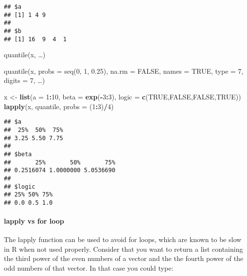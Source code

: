 \documentclass[
]{article}
\newenvironment{Shaded}{\begin{snugshade}}{\end{snugshade}}
\newcommand{\AttributeTok}[1]{\textcolor[rgb]{0.13,0.29,0.53}{#1}}
\newcommand{\ConstantTok}[1]{\textcolor[rgb]{0.56,0.35,0.01}{#1}}
\newcommand{\DecValTok}[1]{\textcolor[rgb]{0.00,0.00,0.81}{#1}}
\newcommand{\FunctionTok}[1]{\textcolor[rgb]{0.13,0.29,0.53}{\textbf{#1}}}
\newcommand{\NormalTok}[1]{#1}
\newcommand{\OtherTok}[1]{\textcolor[rgb]{0.56,0.35,0.01}{#1}}
\newcommand{\SpecialCharTok}[1]{\textcolor[rgb]{0.81,0.36,0.00}{\textbf{#1}}}
\begin{document}
\begin{verbatim}
## $a
## [1] 1 4 9
## 
## $b
## [1] 16  9  4  1
\end{verbatim}

quantile(x, \ldots)

quantile(x, probs = seq(0, 1, 0.25), na.rm = FALSE, names = TRUE, type =
7, digits = 7, \ldots)

\begin{Shaded}
\begin{Highlighting}[]
\NormalTok{x }\OtherTok{\textless{}{-}} \FunctionTok{list}\NormalTok{(}\AttributeTok{a =} \DecValTok{1}\SpecialCharTok{:}\DecValTok{10}\NormalTok{, }\AttributeTok{beta =} \FunctionTok{exp}\NormalTok{(}\SpecialCharTok{{-}}\DecValTok{3}\SpecialCharTok{:}\DecValTok{3}\NormalTok{), }\AttributeTok{logic =} \FunctionTok{c}\NormalTok{(}\ConstantTok{TRUE}\NormalTok{,}\ConstantTok{FALSE}\NormalTok{,}\ConstantTok{FALSE}\NormalTok{,}\ConstantTok{TRUE}\NormalTok{))}
\FunctionTok{lapply}\NormalTok{(x, quantile, }\AttributeTok{probs =}\NormalTok{ (}\DecValTok{1}\SpecialCharTok{:}\DecValTok{3}\NormalTok{)}\SpecialCharTok{/}\DecValTok{4}\NormalTok{)}
\end{Highlighting}
\end{Shaded}

\begin{verbatim}
## $a
##  25%  50%  75% 
## 3.25 5.50 7.75 
## 
## $beta
##       25%       50%       75% 
## 0.2516074 1.0000000 5.0536690 
## 
## $logic
## 25% 50% 75% 
## 0.0 0.5 1.0
\end{verbatim}

\hypertarget{lapply-vs-for-loop}{%
\paragraph{lapply vs for loop}\label{lapply-vs-for-loop}}

The lapply function can be used to avoid for loops, which are known to
be slow in R when not used properly. Consider that you want to return a
list containing the third power of the even numbers of a vector and the
the fourth power of the odd numbers of that vector. In that case you
could type:
\end{document}
